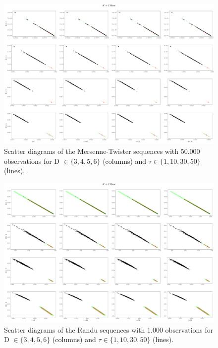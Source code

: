 \documentclass[12pt]{article}
\begin{document}
\begin{description}
	\begin{figure}[H]
	\includegraphics[width=\linewidth]{../../Images/PRNGs/Mersenne-50000.pdf}
	\caption{Scatter diagrams of the Mersenne-Twister sequences with 50.000 observations for D $\in \{3,4,5,6\}$ (columns) and $\tau \in \{1,10,30,50\}$ (lines).}
	\end{figure}

	\begin{figure}[H]
	\includegraphics[width=\linewidth]{../../Images/PRNGs/N1000/Randu-1000.pdf}
	\caption{Scatter diagrams of the Randu sequences with 1.000 observations for D $\in \{3,4,5,6\}$ (columns) and $\tau \in \{1,10,30,50\}$ (lines).}
	\end{figure}


\end{description}
\end{document}
